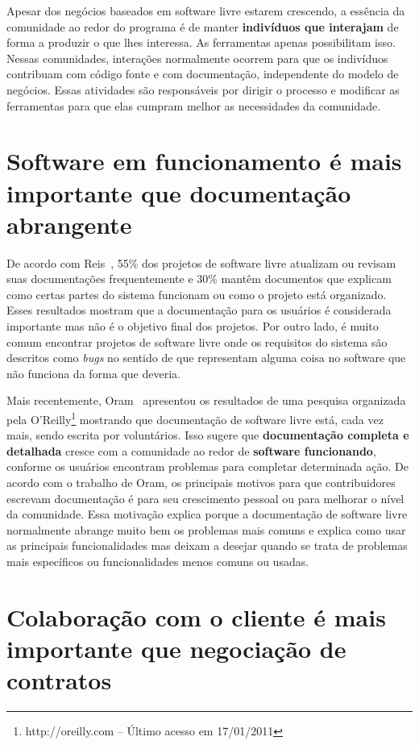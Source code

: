 Apesar dos negócios baseados em software livre estarem crescendo, a
essência da comunidade ao redor do programa é de manter
\textbf{indivíduos que interajam} de forma a produzir o que lhes
interessa. As ferramentas apenas possibilitam isso. Nessas
comunidades, interações normalmente ocorrem para que os indivíduos
contribuam com código fonte e com documentação, independente do modelo
de negócios. Essas atividades são responsáveis por dirigir o processo
e modificar as ferramentas para que elas cumpram melhor as
necessidades da comunidade.

\section{Software em funcionamento é mais importante que documentação
  abrangente}
\label{sec:second-princ}

De acordo com Reis~\cite{Reis2003}, 55\% dos projetos de software
livre atualizam ou revisam suas documentações frequentemente e 30\%
mantêm documentos que explicam como certas partes do sistema funcionam
ou como o projeto está organizado. Esses resultados mostram que a
documentação para os usuários é considerada importante mas não é o
objetivo final dos projetos. Por outro lado, é muito comum encontrar
projetos de software livre onde os requisitos do sistema são descritos
como \emph{bugs} no sentido de que representam alguma coisa no
software que não funciona da forma que deveria.

Mais recentemente, Oram~\cite{Oram2007} apresentou os resultados de
uma pesquisa organizada pela O'Reilly\footnote{http://oreilly.com --
  Último acesso em 17/01/2011} mostrando que documentação de software
livre está, cada vez mais, sendo escrita por voluntários. Isso sugere
que \textbf{documentação completa e detalhada} cresce com a comunidade
ao redor de \textbf{software funcionando}, conforme os usuários
encontram problemas para completar determinada ação. De acordo com o
trabalho de Oram, os principais motivos para que contribuidores
escrevam documentação é para seu crescimento pessoal ou para melhorar
o nível da comunidade. Essa motivação explica porque a documentação de
software livre normalmente abrange muito bem os problemas mais comuns
e explica como usar as principais funcionalidades mas deixam a desejar
quando se trata de problemas mais específicos ou funcionalidades menos
comuns ou usadas.

\section{Colaboração com o cliente é mais importante que negociação de
  contratos}
\label{sec:third-princ}

